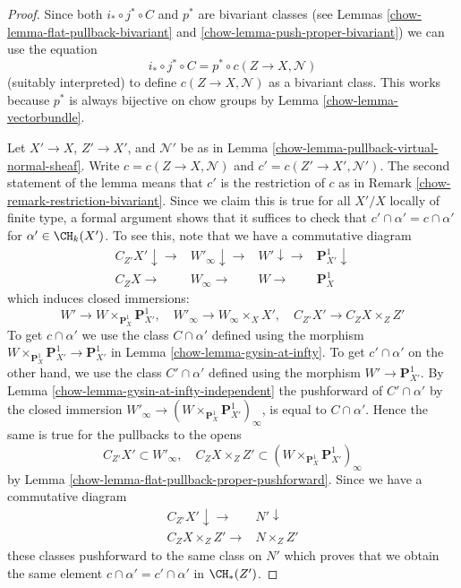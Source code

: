 \begin{proof}

Since both $i_* \circ j^* \circ C$ and $p^*$ are bivariant classes
(see Lemmas \ref{chow-lemma-flat-pullback-bivariant} and
\ref{chow-lemma-push-proper-bivariant}) we can use the equation
$$
i_* \circ j^* \circ C  = p^* \circ c(Z \to X, \mathcal{N})
$$
(suitably interpreted) to define $c(Z \to X, \mathcal{N})$
as a bivariant class. This works because $p^*$ is always
bijective on chow groups by Lemma \ref{chow-lemma-vectorbundle}.

\medskip\noindent
Let $X' \to X$, $Z' \to X'$, and $\mathcal{N}'$ be as in
Lemma \ref{chow-lemma-pullback-virtual-normal-sheaf}. Write
$c = c(Z \to X, \mathcal{N})$ and $c' = c(Z' \to X', \mathcal{N}')$.
The second statement of the lemma means that $c'$ is the restriction of $c$
as in Remark \ref{chow-remark-restriction-bivariant}. Since we claim this
is true for all $X'/X$ locally of finite type, a formal argument
shows that it suffices to check that $c' \cap \alpha' = c \cap \alpha'$
for $\alpha' \in \CH_k(X')$.
To see this, note that we have a commutative diagram
$$
\begin{array}{cccc}C_{Z'}X' \downarrow\longrightarrow & W'_\infty \downarrow\longrightarrow & W' \downarrow\longrightarrow & \mathbf{P}^1_{X'} \downarrow \\ C_ZX \longrightarrow & W_\infty \longrightarrow & W \longrightarrow & \mathbf{P}^1_X\end{array}
$$
which induces closed immersions:
$$
W' \to W \times_{\mathbf{P}^1_X} \mathbf{P}^1_{X'},\quad
W'_\infty \to W_\infty \times_X X',\quad
C_{Z'}X' \to C_ZX \times_Z Z'
$$
To get $c \cap \alpha'$ we use the class $C \cap \alpha'$
defined using the morphism
$W \times_{\mathbf{P}^1_X} \mathbf{P}^1_{X'} \to \mathbf{P}^1_{X'}$
in Lemma \ref{chow-lemma-gysin-at-infty}.
To get $c' \cap \alpha'$ on the other hand, we use the class
$C' \cap \alpha'$ defined using the morphism $W' \to \mathbf{P}^1_{X'}$.
By Lemma \ref{chow-lemma-gysin-at-infty-independent} the pushforward of
$C' \cap \alpha'$ by the closed immersion
$W'_\infty \to (W \times_{\mathbf{P}^1_X} \mathbf{P}^1_{X'})_\infty$,
is equal to $C \cap \alpha'$. Hence the same is true for the pullbacks
to the opens
$$
C_{Z'}X' \subset W'_\infty,\quad
C_ZX \times_Z Z' \subset (W \times_{\mathbf{P}^1_X} \mathbf{P}^1_{X'})_\infty
$$
by Lemma \ref{chow-lemma-flat-pullback-proper-pushforward}.
Since we have a commutative diagram
$$
\begin{array}{cc}C_{Z'} X' \downarrow\longrightarrow & N' \downarrow \\ C_ZX \times_Z Z' \longrightarrow & N \times_Z Z'\end{array}
$$
these classes pushforward to the same class on $N'$ which
proves that we obtain the same element $c \cap \alpha' = c' \cap \alpha'$
in $\CH_*(Z')$.
\end{proof}


